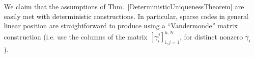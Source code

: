 \documentclass[journal, twocolumn]{IEEEtran}
\begin{document}
We claim that the assumptions of Thm.~\ref{DeterministicUniquenessTheorem} are easily met with deterministic constructions. In particular, sparse codes in general linear position are straightforward to produce using a ``Vandermonde'' matrix construction (i.e. use the columns of the matrix $[\gamma_{i}^j]_{i,j=1}^{k,N}$, for distinct nonzero $\gamma_i$).   %
%
%
%
\end{document}
